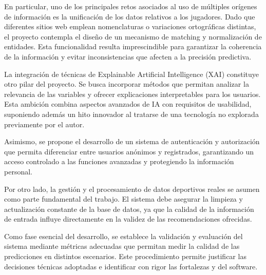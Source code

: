 En particular, uno de los principales retos asociados al uso de múltiples orígenes de información es la
unificación de los datos relativos a los jugadores. Dado que diferentes sitios web emplean nomenclaturas
 o variaciones ortográficas distintas, el proyecto contempla el diseño de un mecanismo de matching y 
 normalización de entidades. Esta funcionalidad resulta imprescindible para garantizar la coherencia
  de la información y evitar inconsistencias que afecten a la precisión predictiva.

La integración de técnicas de Explainable Artificial Intelligence (XAI) constituye otro pilar del proyecto. Se busca incorporar métodos que permitan analizar la relevancia de las variables y ofrecer
  explicaciones interpretables para los usuarios. Esta ambición combina aspectos avanzados de IA con requisitos
   de usabilidad, suponiendo además un hito innovador al tratarse de una tecnología no explorada previamente
    por el autor.

Asimismo, se propone el desarrollo de un sistema de autenticación y autorización que permita diferenciar 
entre usuarios anónimos y registrados, garantizando un acceso controlado a las funciones avanzadas y 
protegiendo la información personal.

Por otro lado, la gestión y el procesamiento de datos deportivos reales se asumen como parte fundamental
del trabajo. El sistema debe asegurar la limpieza y actualización constante de la base de datos,
 ya que la calidad de la información de entrada influye directamente en la validez de las recomendaciones 
 ofrecidas.

Como fase esencial del desarrollo, se establece la validación y evaluación del sistema mediante métricas 
adecuadas que permitan medir la calidad de las predicciones en distintos escenarios. Este procedimiento 
permite justificar las decisiones técnicas adoptadas e identificar con rigor las fortalezas y 
 del software.

